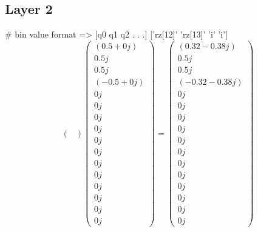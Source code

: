 \documentclass{article}%
\begin{document}
\subsection{Layer 2}%
\label{subsec:Layer2}%
\#  bin value format       => {[}q0 q1 q2 . . .{]}\newline%
%
{[}'rz{[}12{]}' 'rz{[}13{]}' 'i' 'i'{]}%
\[%
\begin{pmatrix}%
%
\end{pmatrix} \begin{pmatrix}%
(0.5+0j)\\%
0.5j\\%
0.5j\\%
(-0.5+0j)\\%
0j\\%
0j\\%
0j\\%
0j\\%
0j\\%
0j\\%
0j\\%
0j\\%
0j\\%
0j\\%
0j\\%
0j%
\end{pmatrix} = \begin{pmatrix}%
(0.32-0.38j)\\%
0.5j\\%
0.5j\\%
(-0.32-0.38j)\\%
0j\\%
0j\\%
0j\\%
0j\\%
0j\\%
0j\\%
0j\\%
0j\\%
0j\\%
0j\\%
0j\\%
0j%
\end{pmatrix}%
\]

%
\end{document}
